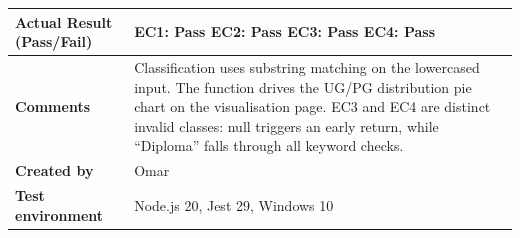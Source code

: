 \begin{table}[h!]
\begin{tabular}{|p{}|p{}|}
\textbf{Actual Result (Pass/Fail)} & EC1: Pass \newline EC2: Pass \newline EC3: Pass \newline EC4: Pass \\ \hline
\textbf{Comments} & Classification uses substring matching on the lowercased input. The function drives the UG/PG distribution pie chart on the visualisation page. EC3 and EC4 are distinct invalid classes: null triggers an early return, while ``Diploma'' falls through all keyword checks. \\ \hline
\textbf{Created by} & Omar \\ \hline
\textbf{Test environment} & Node.js 20, Jest 29, Windows 10 \\ \hline
\end{tabular}
\end{table}

